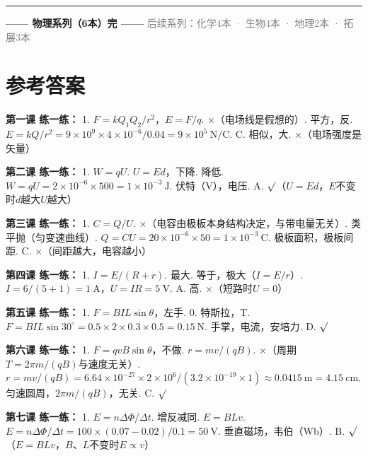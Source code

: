 \documentclass[a4paper,12pt]{ctexart}
\begin{document}
\vspace{0.5cm}
\begin{center}\rule{0.7\textwidth}{1pt}\vspace{0.4cm}
{\large\textcolor{blue!70!black}{\textbf{—— 物理系列（6本）完 ——}}}
\vspace{0.3cm}\textcolor{gray}{\small 后续系列：化学4本 · 生物4本 · 地理2本 · 拓展3本}
\end{center}

\newpage
\section*{\textcolor{defblue}{参考答案}}

\textbf{第一课 练一练：}
1. $F=kQ_1Q_2/r^2$，$E=F/q$. ×（电场线是假想的）. 平方，反. $E=kQ/r^2=9\times10^9\times4\times10^{-6}/0.04=9\times10^5\ \text{N/C}$. C. 相似，大. ×（电场强度是矢量）

\textbf{第二课 练一练：}
1. $W=qU$. $U=Ed$，下降. 降低. $W=qU=2\times10^{-6}\times500=1\times10^{-3}\ \text{J}$. 伏特（V），电压. A. $\surd$（$U=Ed$，$E$不变时$d$越大$U$越大）

\textbf{第三课 练一练：}
1. $C=Q/U$. ×（电容由极板本身结构决定，与带电量无关）. 类平抛（匀变速曲线）. $Q=CU=20\times10^{-6}\times50=1\times10^{-3}\ \text{C}$. 极板面积，极板间距. C. ×（间距越大，电容越小）

\textbf{第四课 练一练：}
1. $I=E/(R+r)$. 最大. 等于，极大（$I=E/r$）. $I=6/(5+1)=1\ \text{A}$，$U=IR=5\ \text{V}$. A. 高. ×（短路时$U=0$）

\textbf{第五课 练一练：}
1. $F=BIL\sin\theta$，左手. 0. 特斯拉，T. $F=BIL\sin30^\circ=0.5\times2\times0.3\times0.5=0.15\ \text{N}$. 手掌，电流，安培力. D. $\surd$

\textbf{第六课 练一练：}
1. $F=qvB\sin\theta$，不做. $r=mv/(qB)$. ×（周期$T=2\pi m/(qB)$与速度无关）. $r=mv/(qB)=6.64\times10^{-27}\times2\times10^6/(3.2\times10^{-19}\times1)\approx0.0415\ \text{m}=4.15\ \text{cm}$. 匀速圆周，$2\pi m/(qB)$，无关. C. $\surd$

\textbf{第七课 练一练：}
1. $E=n\Delta\Phi/\Delta t$. 增反减同. $E=BLv$. $E=n\Delta\Phi/\Delta t=100\times(0.07-0.02)/0.1=50\ \text{V}$. 垂直磁场，韦伯（Wb）. B. $\surd$（$E=BLv$，$B$、$L$不变时$E\propto v$）
\end{document}
